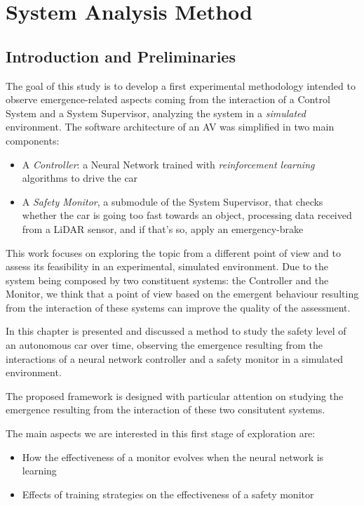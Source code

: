 \chapter{System Analysis Method}

\section{Introduction and Preliminaries}

The goal of this study is to develop a first experimental methodology intended to observe emergence-related aspects coming from the interaction of a Control System and a System Supervisor, analyzing the system in a \textsl{simulated} environment.\newline
The software architecture of an AV was simplified in two main components:

\begin{itemize}
	\item A \textsl{Controller}: a Neural Network trained with \textsl{reinforcement learning} algorithms to drive the car
	\item A \textsl{Safety Monitor}, a submodule of the System Supervisor, that checks whether the car is going too fast towards an object, processing data received from a LiDAR sensor, and if that's so, apply an emergency-brake
\end{itemize}

This work focuses on exploring the topic from a different point of view and to assess its feasibility in an experimental, simulated environment. Due to the system being composed by two constituent systems: the Controller and the Monitor, we think that a point of view based on the emergent behaviour resulting from the interaction of these systems can improve the quality of the assessment.

In this chapter is presented and discussed a method to study the safety level of an autonomous car over time, observing the emergence resulting from the interactions of a neural network controller and a safety monitor in a simulated environment.

The proposed framework is designed with particular attention on studying the emergence resulting from the interaction of these two consitutent systems.

The main aspects we are interested in this first stage of exploration are:

\begin{itemize}
	\item How the effectiveness of a monitor evolves when the neural network is learning
	\item Effects of training strategies on the effectiveness of a safety monitor
\end{itemize}

